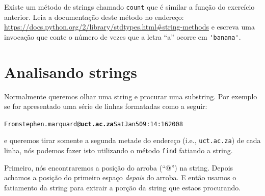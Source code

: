 {\begin{ex}

Existe um método de strings chamado {\tt count} que é similar a função do
exercício anterior. Leia a documentação deste método no endereço:
\url{https://docs.python.org/2/library/stdtypes.html#string-methods}
e escreva uma invocação que conte o número de vezes que a letra ``a'' ocorre
em \verb"'banana'".
\end{ex}

\section{Analisando strings}

Normalmente queremos olhar uma string e procurar uma substring. Por exemplo
se for apresentado uma série de linhas formatadas como a seguir:

\beforeverb
\begin{alltt}
From stephen.marquard@{\bf uct.ac.za} Sat Jan  5 09:14:16 2008
\end{alltt}
\afterverb


e queremos tirar somente a segunda metade do endereço (i.e., {\tt uct.ac.za})
de cada linha, nós podemos fazer isto utilizando o método {\tt find} fatiando
a string.


Primeiro, nós encontraremos a posição do arroba (``@'') na string. Depois
achamos a posição do primeiro espaço \emph{depois} do arroba. E então usamos
o fatiamento da string para extrair a porção da string que estaos procurando.

}
